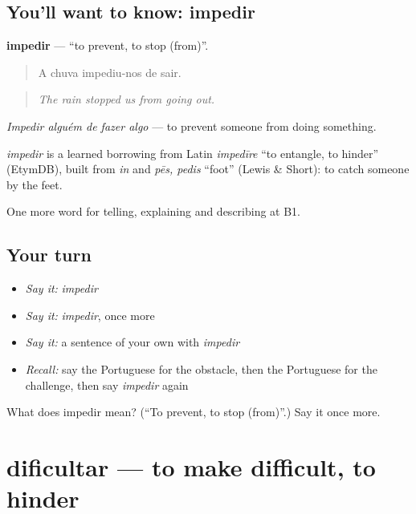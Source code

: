\subsection*{You'll want to know: impedir}
\textbf{impedir} — \textquotedblleft{}to prevent, to stop (from)\textquotedblright{}.

\begin{quote}
A chuva impediu-nos de sair.
\end{quote}

\begin{quote}
\emph{The rain stopped us from going out.}
\end{quote}

\emph{Impedir alguém de fazer algo} — to prevent someone from doing something.

\begin{cousinweb}
\emph{impedir} is a learned borrowing from Latin \emph{impedīre} \textquotedblleft{}to entangle, to hinder\textquotedblright{} (EtymDB), built from \emph{in} and \emph{pēs, pedis} \textquotedblleft{}foot\textquotedblright{} (Lewis \& Short): to catch someone by the feet.
\end{cousinweb}

\begin{grammarlens}[title={What you've built}]
One more word for telling, explaining and describing at B1.
\end{grammarlens}

\subsection*{Your turn}
\begin{itemize}
\raggedright
  \item \emph{Say it:} \emph{impedir}
  \item \emph{Say it:} \emph{impedir}, once more
  \item \emph{Say it:} a sentence of your own with \emph{impedir}
  \item \emph{Recall:} say the Portuguese for the obstacle, then the Portuguese for the challenge, then say \emph{impedir} again
\end{itemize}

\begin{tcolorbox}[breakable,colback=teal!4,colframe=teal!35!black,title={Before you move on}]
What does impedir mean? (\textquotedblleft{}To prevent, to stop (from)\textquotedblright{}.) Say it once more.
\end{tcolorbox}
\section[dificultar]{dificultar — to make difficult, to hinder}

